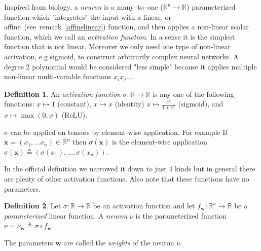 \documentclass[11pt, a4paper]{report}
\theoremstyle{plain}
\theoremstyle{definition}
\newtheorem{mydef}{Definition}[chapter]
\theoremstyle{remark}
\newcommand{\R}{\mathbb{R}}
\newcommand{\x}{\mathbf{x}}
\newcommand{\w}{\mathbf{w}}
\begin{document}
Inspired from biology, a \emph{neuron} is a many--to--one ($\R^n \to \R$)
parameterized function which "integrates" the input with a linear, or
affine~(see~remark~\ref{affinelinear}) function, and then applies a non-linear
scalar function, which we call an \emph{activation function}. In a sense it is
the simplest function that is not linear. Moreover we only need one type of
non-linear activation, e.g sigmoid, to construct arbitrarily complex neural
networks. A degree 2 polynomial would be considered "less simple" because it
applies multiple non-linear multi-variable functions $x_i x_j\dots$.

\begin{mydef}
\label{def:activationfunction}
An \emph{activation function} $\sigma : \R \to \R$ is any one of the following
functions: $x \mapsto 1$ (constant), $x \mapsto x$ (identity) $ x \mapsto
\frac{e^x}{1 + e^x}$ (sigmoid), and $x \mapsto \max(0,x)$ (ReLU).

$\sigma$ can be applied on tensors by element-wise application. For example If
$\x = (x_1, \dots x_n) \in \R^n$ then $\sigma(\x)$ is the element-wise
application $\sigma(\x) \triangleq (\sigma(x_1), \dots , \sigma(x_n))$.
\end{mydef}

In the official definition we narrowed it down to just 4 kinds but in general
there are plenty of other activation functions. Also note that these functions
have no parameters.

\begin{mydef}
\label{def:neuron}
Let $\sigma : \R \to \R$ be an activation function and let $f_{\w} : \R^n \to \R$
be a \emph{parameterized} linear function. A \emph{neuron} $\nu$ is the
parameterized function 
$\nu =  \nu_{\w} \triangleq \sigma \circ
f_{\w}$.

The parameters $\w$ are called the \emph{weights} of the neuron $\nu$.
\end{mydef}

\end{document}
